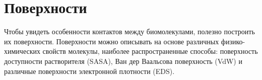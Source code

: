 \section{Поверхности}

Чтобы увидеть особенности контактов между биомолекулами, полезно построить их поверхности. Поверхности можно описывать на основе различных физико-химических свойств молекулы, наиболее распространенные способы: поверхность доступности растворителя (SASA), Ван дер Ваальсова поверхность (VdW) и различные поверхности электронной плотности (EDS).